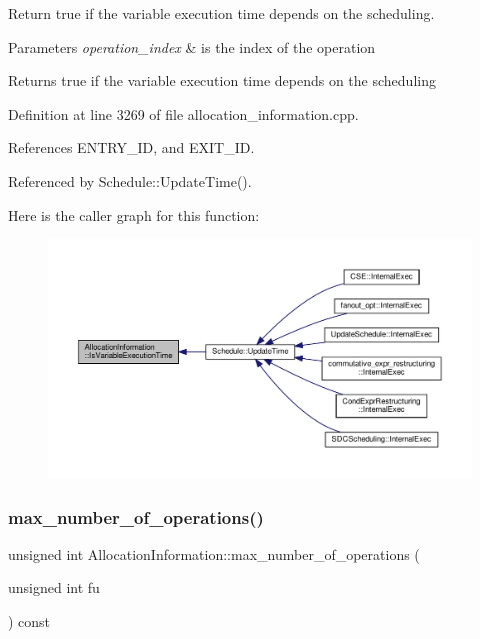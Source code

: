 Return true if the variable execution time depends on the scheduling. 


\begin{DoxyParams}{Parameters}
{\em operation\+\_\+index} & is the index of the operation \\
\hline
\end{DoxyParams}
\begin{DoxyReturn}{Returns}
true if the variable execution time depends on the scheduling 
\end{DoxyReturn}


Definition at line 3269 of file allocation\+\_\+information.\+cpp.



References E\+N\+T\+R\+Y\+\_\+\+ID, and E\+X\+I\+T\+\_\+\+ID.



Referenced by Schedule\+::\+Update\+Time().

Here is the caller graph for this function\+:
\nopagebreak
\begin{figure}[H]
\begin{center}
\leavevmode
\includegraphics[width=350pt]{d7/d79/classAllocationInformation_a57b2fe03c5c482134de341b1368f8533_icgraph}
\end{center}
\end{figure}
\mbox{\label{classAllocationInformation_a5e95ad970c76cfd32541915146d79002}} 
\subsubsection{\texorpdfstring{max\+\_\+number\+\_\+of\+\_\+operations()}{max\_number\_of\_operations()}}
{\footnotesize\ttfamily unsigned int Allocation\+Information\+::max\+\_\+number\+\_\+of\+\_\+operations (\begin{DoxyParamCaption}\item[{unsigned int}]{fu }\end{DoxyParamCaption}) const}



